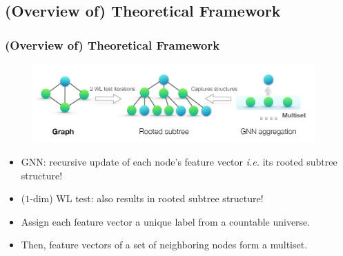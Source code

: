 \documentclass[handout]{beamer}
\begin{document}
\subsection{(Overview of) Theoretical Framework}

\begin{frame}
\frametitle{(Overview of) Theoretical Framework}

\begin{figure}[hbt]
	\includegraphics[height=3cm]{fig2.png}
\end{figure}

\begin{itemize}
    \item GNN: recursive update of each node's feature vector {\it i.e.} its rooted subtree structure! \pause
    
    \item ($1$-dim) WL test: also results in rooted subtree structure! \pause
    
    \item Assign each feature vector a unique label from a countable universe. \pause
    
    \item Then, feature vectors of a set of neighboring nodes form a \alert{multiset}.
\end{itemize}
\end{frame}
\end{document}
